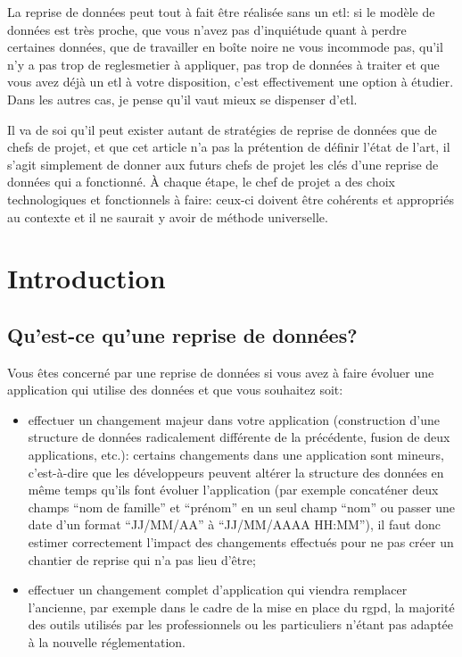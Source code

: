\documentclass{book}
\begin{document}
La reprise de données peut tout à fait être réalisée sans un \gls{etl}: si le modèle de données est très proche, que vous n'avez pas d'inquiétude quant à perdre certaines données, que de travailler en boîte noire ne vous incommode pas, qu'il n'y a pas trop de \gls{reglesmetier} à appliquer, pas trop de données à traiter et que vous avez déjà un \gls{etl} à votre disposition, c'est effectivement une option à étudier. Dans les autres cas, je pense qu'il vaut mieux se dispenser d'\gls{etl}.

\medbreak

Il va de soi qu'il peut exister autant de stratégies de reprise de données que de chefs de projet, et que cet article n'a pas la prétention de définir l'état de l'art, il s'agit simplement de donner aux futurs chefs de projet les clés d'une reprise de données qui a fonctionné. À chaque étape, le chef de projet a des choix technologiques et fonctionnels à faire: ceux-ci doivent être cohérents et appropriés au contexte et il ne saurait y avoir de méthode universelle.

\newpage
\begingroup
\hypersetup{linkcolor=black}
\tableofcontents
\endgroup
\listoffigures

\chapter{Introduction}
\section{Qu'est-ce qu'une reprise de données?}

Vous êtes concerné par une reprise de données si vous avez à faire évoluer une application qui utilise des données et que vous souhaitez soit:
\begin{itemize}
\item effectuer un changement majeur dans votre application (construction d'une structure de données radicalement différente de la précédente, fusion de deux applications, etc.): certains changements dans une application sont mineurs, c'est-à-dire que les développeurs peuvent altérer la structure des données en même temps qu'ils font évoluer l'application (par exemple concaténer deux champs ``nom de famille'' et ``prénom'' en un seul champ ``nom'' ou passer une date d'un format ``JJ/MM/AA'' à ``JJ/MM/AAAA HH:MM''), il faut donc estimer correctement l'impact des changements effectués pour ne pas créer un chantier de reprise qui n'a pas lieu d'être;
\item effectuer un changement complet d'application qui viendra remplacer l'ancienne, par exemple dans le cadre de la mise en place du \gls{rgpd}, la majorité des outils utilisés par les professionnels ou les particuliers n'étant pas adaptée à la nouvelle réglementation.
\end{itemize}
\end{document}
